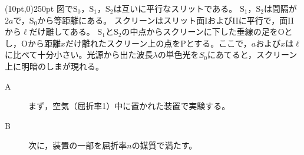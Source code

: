 \hakosyokika
\item
    \begin{mawarikomi}(10pt,0){250pt}{}
        図で$\mathrm{S_0}$，$\mathrm{S_1}$，$\mathrm{S_2}$は互いに平行なスリットである。
        $\mathrm{S_1}$，$\mathrm{S_2}$は間隔が$2a$で，$\mathrm{S_0}$から等距離にある。
        スクリーンはスリット面IおよびIIに平行で，面IIから$\ell $だけ離してある。
        $\mathrm{S_1}$と$\mathrm{S_2}$の中点からスクリーンに下した垂線の足をOとし，Oから距離$x$だけ離れたスクリーン上の点をPとする。ここで，$a$および$x$は$\ell $に比べて十分小さい。光源から出た波長$\lambda $の単色光を$S_0$にあてると，スクリーン上に明暗のしまが現れる。
        \begin{description}
            \item[A] まず，空気（屈折率1）中に置かれた装置で実験する。
        \end{description}
        \begin{description}
            \item[B] 次に，装置の一部を屈折率$n$の媒質で満たす。
        \end{description}
\end{mawarikomi}